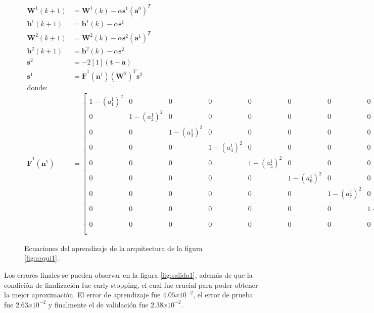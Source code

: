 \begin{figure}[H]
    \tiny
    \begin{align*}
    \boldsymbol{W}^{1}(k+1) &= \boldsymbol{W}^{1}(k) - \alpha \boldsymbol{s}^{1} (\boldsymbol{a}^{0})^T \\
    \boldsymbol{b}^{1}(k+1) &= \boldsymbol{b}^{1}(k) - \alpha \boldsymbol{s}^{1} \\
    \boldsymbol{W}^{2}(k+1) &= \boldsymbol{W}^{2}(k) - \alpha \boldsymbol{s}^{2} (\boldsymbol{a}^{1})^T \\
    \boldsymbol{b}^{2}(k+1) &= \boldsymbol{b}^{2}(k) - \alpha \boldsymbol{s}^{2} \\
    \boldsymbol{s}^2 &= 
    -2 \left[ 1 \right] (\boldsymbol{t-a}) \\
    \boldsymbol{s}^{1} &= 
    \boldsymbol{\dot{F}}^{1}(\boldsymbol{n}^{1})(\boldsymbol{W}^{2})^{T}
    \boldsymbol{s}^{2} \\
    \text{donde:} \\
    \boldsymbol{\dot{F}}^{1}(\boldsymbol{n}^{1}) &=
    \begin{bmatrix}
        1-(a_{1}^1)^2 & 0 & 0 & 0 & 0 & 0 & 0 & 0 & 0 \\
        0 & 1-(a_{2}^1)^2 & 0 & 0 & 0 & 0 & 0 & 0 & 0 \\
        0 & 0 & 1-(a_{3}^1)^2 & 0 & 0 & 0 & 0 & 0 & 0 \\
        0 & 0 & 0 & 1-(a_{4}^1)^2 & 0 & 0 & 0 & 0 & 0 \\
        0 & 0 & 0 & 0 & 1-(a_{5}^1)^2 & 0 & 0 & 0 & 0 \\
        0 & 0 & 0 & 0 & 0 & 1-(a_{6}^1)^2 & 0 & 0 & 0 \\
        0 & 0 & 0 & 0 & 0 & 0 & 1-(a_{7}^1)^2 & 0 & 0 \\
        0 & 0 & 0 & 0 & 0 & 0 & 0 & 1-(a_{8}^1)^2 & 0 \\
        0 & 0 & 0 & 0 & 0 & 0 & 0 & 0 & 1-(a_{9}^1)^2 \\
    \end{bmatrix}
    \end{align*}
    \caption{Ecuaciones del aprendizaje de la arquitectura de la figura \ref{fig:arqui1}.}
\end{figure}

Los errores finales se pueden observar en la figura \ref{fig:salida1}, además de que la condición de finalización fue early stopping, el cual fue crucial para poder obtener la mejor aproximación. El error de aprendizaje fue $4.05 x 10^{-2}$, el error de prueba fue $2.63 x 10^{-2}$ y finalmente el de validación fue $2.38 x 10^{-2}$.

